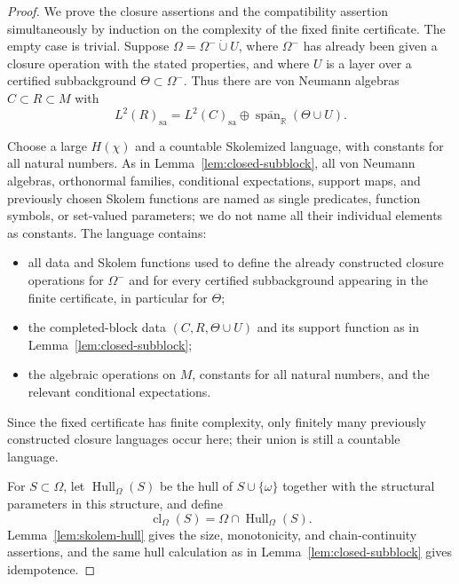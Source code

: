 \documentclass[11pt,letterpaper,reqno]{amsart}
\theoremstyle{definition}
\numberwithin{equation}{section}
\newcommand{\sa}{\mathrm{sa}}
\newcommand{\RR}{\mathbb R}
\newcommand{\cl}{\operatorname{cl}}
\DeclareMathOperator{\spanop}{span}
\DeclareMathOperator{\Hull}{Hull}
\begin{document}
\begin{proof}
We prove the closure assertions and the compatibility assertion simultaneously
by induction on the complexity of the fixed finite certificate. The empty case
is trivial. Suppose $\Omega=\Omega^-\dot\cup U$, where $\Omega^-$ has already been given a closure operation with the stated properties, and where $U$ is a layer over a certified subbackground $\Theta\subset\Omega^-$.  Thus there are von Neumann algebras $C\subset R\subset M$ with
\[
   L^2(R)_{\sa}=L^2(C)_{\sa}\oplus\overline{\spanop_{\RR}}(\Theta\cup U).
\]

Choose a large \(H(\chi)\) and a countable Skolemized language, with constants
for all natural numbers.  As in Lemma~\ref{lem:closed-subblock}, all
von Neumann algebras, orthonormal families, conditional expectations, support
maps, and previously chosen Skolem functions are named as single predicates, function symbols, or set-valued parameters; we do not name all their individual elements as constants.  The language contains:
\begin{itemize}[leftmargin=2em]
\item all data and Skolem functions used to define the already constructed closure operations for $\Omega^-$ and for every certified subbackground appearing in the finite certificate, in particular for $\Theta$;
\item the completed-block data $(C,R,\Theta\cup U)$ and its support function as in Lemma~\ref{lem:closed-subblock};
\item the algebraic operations on $M$, constants for all natural numbers, and the relevant conditional expectations.
\end{itemize}
Since the fixed certificate has finite complexity, only finitely many
previously constructed closure languages occur here; their union is still a
countable language.

For $S\subset\Omega$, let $\Hull_\Omega(S)$ be the hull of $S\cup\{\omega\}$ together with the structural parameters in this structure, and define
\[
   \cl_\Omega(S)=\Omega\cap\Hull_\Omega(S).
\]
Lemma~\ref{lem:skolem-hull} gives the size, monotonicity, and chain-continuity assertions, and the same hull calculation as in Lemma~\ref{lem:closed-subblock} gives idempotence.


\end{proof}
\end{document}
